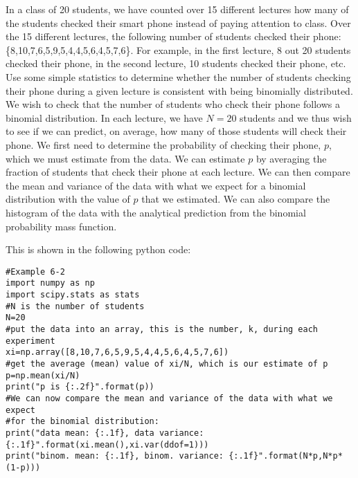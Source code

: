 \begin{example}{}{In a class of 20 students, we have counted over 15 different lectures how many of the students checked their smart phone instead of paying attention to class. Over the 15 different lectures, the following number of students checked their phone: \{8,10,7,6,5,9,5,4,4,5,6,4,5,7,6\}. For example, in the first lecture, 8 out 20 students checked their phone, in the second lecture, 10 students checked their phone, etc. Use some simple statistics to determine whether the number of students checking their phone during a given lecture is consistent with being binomially distributed.}{}
\label{ex:BinomialPhones}
We wish to check that the number of students who check their phone follows a binomial distribution. In each lecture, we have $N=20$ students and we thus wish to see if we can predict, on average, how many of those students will check their phone. We first need to determine the probability of checking their phone, $p$, which we must estimate from the data. We can estimate $p$ by averaging the fraction of students that check their phone at each lecture. We can then compare the mean and variance of the data with what we expect for a binomial distribution with the value of $p$ that we estimated. We can also compare the histogram of the data with the analytical prediction from the binomial probability mass function.

This is shown in the following python code:
\begin{lstlisting}[frame=single] 
#Example 6-2
import numpy as np
import scipy.stats as stats
#N is the number of students
N=20
#put the data into an array, this is the number, k, during each experiment
xi=np.array([8,10,7,6,5,9,5,4,4,5,6,4,5,7,6])
#get the average (mean) value of xi/N, which is our estimate of p
p=np.mean(xi/N)
print("p is {:.2f}".format(p))
#We can now compare the mean and variance of the data with what we expect 
#for the binomial distribution:
print("data mean: {:.1f}, data variance: {:.1f}".format(xi.mean(),xi.var(ddof=1)))
print("binom. mean: {:.1f}, binom. variance: {:.1f}".format(N*p,N*p*(1-p)))


\end{lstlisting}
\end{example}
